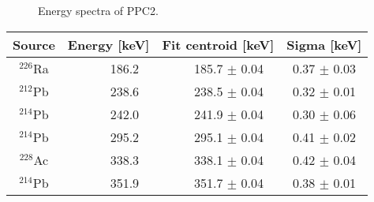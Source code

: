 				\begin{figure}
					\centering
					\caption[Energy spectra of PPC2]
					{Energy spectra of PPC2.}
					\label{fig:PPC2EnergySpectra}
				\end{figure}	
	
				\begin{table}
					\centering
					\begin{tabular}{  c | r | r | c  }
					\hline
					{\bf Source} & {\bf Energy [keV]} & {\bf Fit centroid [keV]} & {\bf Sigma [keV]} \\  
					\hline
					$^{226}$Ra     & 186.2     ~ & 185.7      ${\pm}$ 0.04       ~ & 0.37       ${\pm}$ 0.03       \\
					$^{212}$Pb     & 238.6     ~ & 238.5      ${\pm}$ 0.04       ~ & 0.32       ${\pm}$ 0.01       \\
					$^{214}$Pb     & 242.0     ~ & 241.9      ${\pm}$ 0.04       ~ & 0.30       ${\pm}$ 0.06       \\
					$^{214}$Pb     & 295.2     ~ & 295.1      ${\pm}$ 0.04       ~ & 0.41       ${\pm}$ 0.02       \\
					$^{228}$Ac     & 338.3     ~ & 338.1      ${\pm}$ 0.04       ~ & 0.42       ${\pm}$ 0.04       \\
					$^{214}$Pb     & 351.9     ~ & 351.7      ${\pm}$ 0.04       ~ & 0.38       ${\pm}$ 0.01       \\

\end{tabular}
\end{table}
